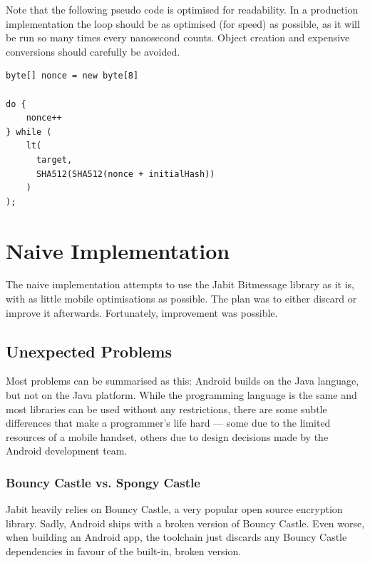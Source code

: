\documentclass{bfh}
\begin{document}
  Note that the following pseudo code is optimised for readability. In a production implementation the loop should be as optimised (for speed) as possible, as it will be run so many times every nanosecond counts. Object creation and expensive conversions should carefully be avoided.

\begin{lstlisting}
byte[] nonce = new byte[8]

do {
    nonce++
} while (
    lt(
      target,
      SHA512(SHA512(nonce + initialHash))
    )
);
\end{lstlisting}



  \newpage
  \section{Naive Implementation}
  
  The naive implementation attempts to use the Jabit Bitmessage library as it is, with as little mobile optimisations as possible. The plan was to either discard or improve it afterwards. Fortunately, improvement was possible.

  \subsection{Unexpected Problems}
  Most problems can be summarised as this: Android builds on the Java language, but not on the Java platform. While the programming language is the same and most libraries can be used without any restrictions, there are some subtle differences that make a programmer's life hard --- some due to the limited resources of a mobile handset, others due to design decisions made by the Android development team.
  
  \subsubsection{Bouncy Castle vs. Spongy Castle}
  \label{subsec:bcvssc}
  Jabit heavily relies on Bouncy Castle, a very popular open source encryption library.\cite{bouncy} Sadly, Android ships with a broken version of Bouncy Castle. Even worse, when building an Android app, the toolchain just discards any Bouncy Castle dependencies in favour of the built-in, broken version.
\end{document}
